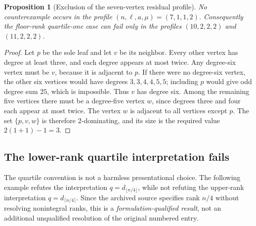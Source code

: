 \documentclass[11pt,a4paper]{article}
\newtheorem{proposition}[theorem]{Proposition}
\theoremstyle{definition}\newtheorem{definition}[theorem]{Definition}
\theoremstyle{remark}\newtheorem{remark}[theorem]{Remark}
\begin{document}
\begin{proposition}[Exclusion of the seven-vertex residual profile]
No counterexample occurs in the profile $(n,\ell,a,\mu)=(7,1,1,2)$.
Consequently the floor-rank quartile-one case can fail only in the
profiles $(10,2,2,2)$ and $(11,2,2,2)$.
\end{proposition}
\begin{proof}
Let $p$ be the sole leaf and let $v$ be its neighbor. Every other
vertex has degree at least three, and each degree appears at most twice.
Any degree-six vertex must be $v$, because it is adjacent to $p$.
If there were no degree-six vertex, the other six vertices would have
degrees $3,3,4,4,5,5$; including $p$ would give odd degree sum $25$,
which is impossible. Thus $v$ has degree six. Among the remaining
five vertices there must be a degree-five vertex $w$, since degrees
three and four each appear at most twice. The vertex $w$ is adjacent
to all vertices except $p$. The set $\{p,v,w\}$ is therefore
2-dominating, and its size is the required value $2(1+1)-1=3$.
\end{proof}


\subsection{The lower-rank quartile interpretation fails}
\label{r12:389a:rounding}
The quartile convention is not a harmless presentational choice. The
following example refutes the interpretation
$q=d_{\lfloor n/4\rfloor}$, while not refuting the upper-rank
interpretation $q=d_{\lceil n/4\rceil}$. Since the archived source
specifies rank $n/4$ without resolving nonintegral ranks, this is a
\emph{formulation-qualified result}, not an additional unqualified
resolution of the original numbered entry.
\end{document}
